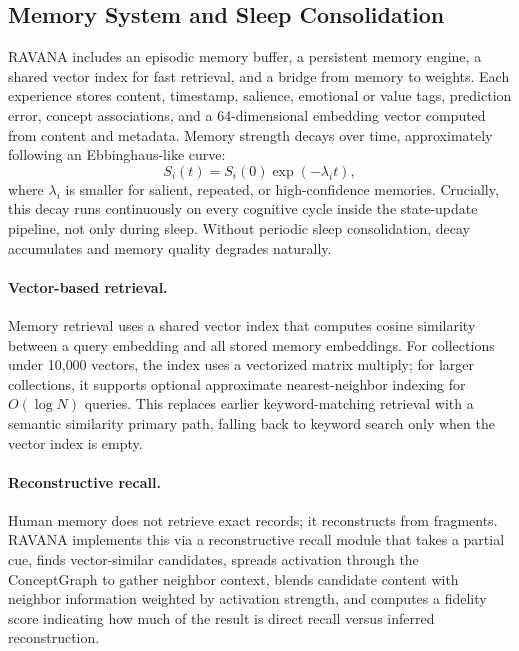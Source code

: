 \documentclass[11pt]{article}
\begin{document}
\subsection{Memory System and Sleep Consolidation}
RAVANA includes an episodic memory buffer, a persistent memory engine, a shared vector index for fast retrieval, and a bridge from memory to weights. Each experience stores content, timestamp, salience, emotional or value tags, prediction error, concept associations, and a 64-dimensional embedding vector computed from content and metadata. Memory strength decays over time, approximately following an Ebbinghaus-like curve:
\begin{equation}
 S_i(t)=S_i(0)\exp(-\lambda_i t),
\end{equation}
where $\lambda_i$ is smaller for salient, repeated, or high-confidence memories. Crucially, this decay runs continuously on every cognitive cycle inside the state-update pipeline, not only during sleep. Without periodic sleep consolidation, decay accumulates and memory quality degrades naturally.

\paragraph{Vector-based retrieval.}
Memory retrieval uses a shared vector index that computes cosine similarity between a query embedding and all stored memory embeddings. For collections under 10{,}000 vectors, the index uses a vectorized matrix multiply; for larger collections, it supports optional approximate nearest-neighbor indexing for $O(\log N)$ queries. This replaces earlier keyword-matching retrieval with a semantic similarity primary path, falling back to keyword search only when the vector index is empty.

\paragraph{Reconstructive recall.}
Human memory does not retrieve exact records; it reconstructs from fragments. RAVANA implements this via a reconstructive recall module that takes a partial cue, finds vector-similar candidates, spreads activation through the ConceptGraph to gather neighbor context, blends candidate content with neighbor information weighted by activation strength, and computes a fidelity score indicating how much of the result is direct recall versus inferred reconstruction.
\end{document}
